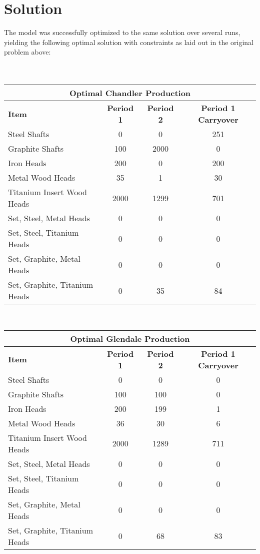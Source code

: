 \documentclass{article}
\begin{document}
\section{Solution}
The model was successfully optimized to the same solution over several runs, yielding the following optimal solution with constraints as laid out in the original problem above:
\\
\\
\\
\noindent
\begin{tabular}{ l | c | c |c }
\hline
\multicolumn{4}{|c|}{Optimal Chandler Production} \\
\hline
\textbf{Item} & \textbf{Period 1} & \textbf{Period 2} & \textbf{Period 1 Carryover} \\
Steel Shafts & 0 & 0 & 251 \\
Graphite Shafts & 100 & 2000 & 0 \\
Iron Heads & 200 & 0 & 200 \\
Metal Wood Heads & 35 & 1 & 30 \\
Titanium Insert Wood Heads & 2000 & 1299 & 701 \\
Set, Steel, Metal Heads & 0 & 0 & 0 \\
Set, Steel, Titanium Heads & 0 & 0 & 0 \\
Set, Graphite, Metal Heads & 0 & 0 & 0 \\
Set, Graphite, Titanium Heads & 0 & 35 & 84\\
\end{tabular}
\vspace{5mm}
\\
\noindent
\begin{tabular}{ l | c | c | c }
\hline
\multicolumn{4}{|c|}{Optimal Glendale Production} \\
\hline
\textbf{Item} & \textbf{Period 1} & \textbf{Period 2} & \textbf{Period 1 Carryover} \\
Steel Shafts & 0 & 0 & 0 \\
Graphite Shafts & 100 & 100 & 0 \\
Iron Heads & 200 & 199 & 1 \\
Metal Wood Heads & 36 & 30 & 6 \\
Titanium Insert Wood Heads & 2000 & 1289 & 711 \\
Set, Steel, Metal Heads & 0 & 0 & 0 \\
Set, Steel, Titanium Heads & 0 & 0 & 0 \\
Set, Graphite, Metal Heads & 0 & 0 & 0 \\
Set, Graphite, Titanium Heads & 0 & 68 & 83\\
\end{tabular}
\end{document}
